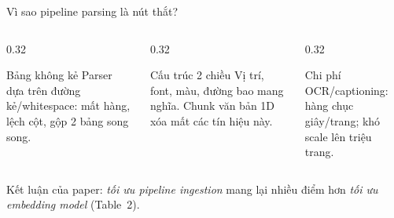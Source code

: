 \documentclass[aspectratio=169,10pt]{beamer}
\begin{document}
\begin{frame}{Vì sao pipeline parsing là nút thắt?}
  \vspace{3mm}
  \begin{columns}[T]
    \begin{column}{0.32\textwidth}
      \begin{block}{\small Bảng không kẻ}
        \footnotesize
        Parser dựa trên đường kẻ/whitespace: mất hàng, lệch cột, gộp 2 bảng song song.
      \end{block}
    \end{column}
    \begin{column}{0.32\textwidth}
      \begin{block}{\small Cấu trúc 2 chiều}
        \footnotesize
        Vị trí, font, màu, đường bao mang nghĩa. Chunk văn bản 1D xóa mất các tín hiệu này.
      \end{block}
    \end{column}
    \begin{column}{0.32\textwidth}
      \begin{block}{\small Chi phí}
        \footnotesize
        OCR/captioning: hàng chục giây/trang; khó scale lên triệu trang.
      \end{block}
    \end{column}
  \end{columns}

  \vspace{1mm}
  \begin{center}
    \footnotesize
    Kết luận của paper: \emph{tối ưu pipeline ingestion} mang lại nhiều điểm hơn \emph{tối ưu embedding model} (Table~2).
  \end{center}
\end{frame}
\end{document}
